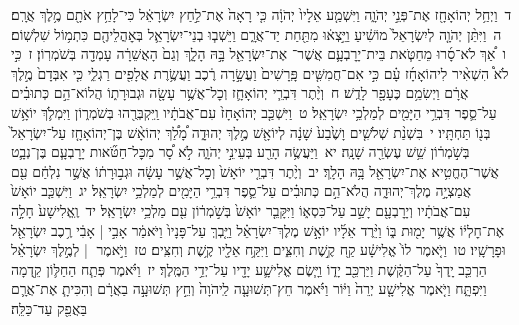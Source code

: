 \documentclass[18pt]{article}
\newcommand{\vart}[1]{\Bfootnote{#1}}	%
\begin{document}
 {\loc ד~}וַיְחַ֥ל יְהוֹאָחָ֖ז אֶת־פְּנֵ֣י יְהֹוָ֑ה וַיִּשְׁמַ֤ע אֵלָיו֙ יְהֹוָ֔ה כִּ֤י רָאָה֙ אֶת־לַ֣חַץ יִשְׂרָאֵ֔ל כִּי־לָחַ֥ץ אֹתָ֖ם מֶ֥לֶךְ אֲרָֽם׃ \startlock
 {\loc ה~}וַיִּתֵּ֨ן יְהֹוָ֤ה לְיִשְׂרָאֵל֙ מוֹשִׁ֔יעַ וַיֵּ֣צְא֔וּ מִתַּ֖חַת יַד־אֲרָ֑ם וַיֵּשְׁב֧וּ בְנֵי־יִשְׂרָאֵ֛ל  בְּאׇהֳלֵיהֶ֖ם  כִּתְמ֥וֹל שִׁלְשֽׁוֹם׃ \startlock
 {\loc ו~}אַ֠ךְ לֹא־סָ֜רוּ מֵחַטֹּ֧את בֵּית־יָרׇבְעָ֛ם אֲשֶׁר־ \edtext{הֶחֱטִ֥י}{\vart{=א | מ"ק-א=<ב' חס' א'> | ל-קרי=הֶחֱטִ֥יא | }}  אֶת־יִשְׂרָאֵ֖ל בָּ֣הּ הָלָ֑ךְ וְגַם֙ הָאֲשֵׁרָ֔ה עָמְדָ֖ה בְּשֹׁמְרֽוֹן׃ \startlock
 {\loc ז~}כִּ֣י לֹא֩ הִשְׁאִ֨יר לִיהוֹאָחָ֜ז עָ֗ם כִּ֣י אִם־חֲמִשִּׁ֤ים פָּֽרָשִׁים֙ וַעֲשָׂ֣רָה רֶ֔כֶב וַעֲשֶׂ֥רֶת אֲלָפִ֖ים רַגְלִ֑י כִּ֤י אִבְּדָם֙ מֶ֣לֶךְ אֲרָ֔ם וַיְשִׂמֵ֥ם כֶּעָפָ֖ר לָדֻֽשׁ׃ \startlock
 {\loc ח~}וְיֶ֨תֶר דִּבְרֵ֧י יְהוֹאָחָ֛ז וְכׇל־אֲשֶׁ֥ר עָשָׂ֖ה וּגְבוּרָת֑וֹ הֲלוֹא־הֵ֣ם כְּתוּבִ֗ים עַל־סֵ֛פֶר דִּבְרֵ֥י הַיָּמִ֖ים לְמַלְכֵ֥י יִשְׂרָאֵֽל׃ \startlock
 {\loc ט~}וַיִּשְׁכַּ֤ב יְהוֹאָחָז֙ עִם־אֲבֹתָ֔יו וַֽיִּקְבְּרֻ֖הוּ בְּשֹׁמְר֑וֹן וַיִּמְלֹ֛ךְ יוֹאָ֥שׁ בְּנ֖וֹ תַּחְתָּֽיו׃ \startlock
 {\loc י~}בִּשְׁנַ֨ת שְׁלֹשִׁ֤ים וָשֶׁ֙בַע֙ שָׁנָ֔ה לְיוֹאָ֖שׁ מֶ֣לֶךְ יְהוּדָ֑ה מָ֠לַ֠ךְ יְהוֹאָ֨שׁ בֶּן־יְהוֹאָחָ֤ז עַל־יִשְׂרָאֵל֙ בְּשֹׁ֣מְר֔וֹן שֵׁ֥שׁ עֶשְׂרֵ֖ה שָׁנָֽה׃ \startlock
 {\loc יא~}וַיַּעֲשֶׂ֥ה הָרַ֖ע בְּעֵינֵ֣י יְהֹוָ֑ה לֹ֣א סָ֠ר מִכׇּל־חַטֹּ֞אות יָרׇבְעָ֧ם בֶּן־נְבָ֛ט אֲשֶׁר־הֶחֱטִ֥יא אֶת־יִשְׂרָאֵ֖ל בָּ֥הּ הָלָֽךְ׃ \startlock
 {\loc יב~}וְיֶ֨תֶר דִּבְרֵ֤י יוֹאָשׁ֙ וְכׇל־אֲשֶׁ֣ר עָשָׂ֔ה וּגְב֣וּרָת֔וֹ אֲשֶׁ֣ר נִלְחַ֔ם עִ֖ם אֲמַצְיָ֣ה מֶלֶךְ־יְהוּדָ֑ה הֲלֹא־הֵ֣ם כְּתוּבִ֗ים עַל־סֵ֛פֶר דִּבְרֵ֥י הַיָּמִ֖ים לְמַלְכֵ֥י יִשְׂרָאֵֽל׃ \startlock
 {\loc יג~}וַיִּשְׁכַּ֤ב יוֹאָשׁ֙ עִם־אֲבֹתָ֔יו וְיָרׇבְעָ֖ם יָשַׁ֣ב עַל־כִּסְא֑וֹ וַיִּקָּבֵ֤ר יוֹאָשׁ֙ בְּשֹׁ֣מְר֔וֹן עִ֖ם מַלְכֵ֥י יִשְׂרָאֵֽל׃ \startlock
 {\loc יד~}וֶֽאֱלִישָׁע֙ חָלָ֣ה אֶת־חׇלְי֔וֹ אֲשֶׁ֥ר יָמ֖וּת בּ֑וֹ וַיֵּ֨רֶד אֵלָ֜יו יוֹאָ֣שׁ מֶלֶךְ־יִשְׂרָאֵ֗ל וַיֵּ֤בְךְּ עַל־פָּנָיו֙ וַיֹּאמַ֔ר אָבִ֣י  |  אָבִ֔י רֶ֥כֶב יִשְׂרָאֵ֖ל וּפָרָשָֽׁיו׃ \startlock
 {\loc טו~}וַיֹּ֤אמֶר לוֹ֙ אֱלִישָׁ֔ע קַ֖ח קֶ֣שֶׁת וְחִצִּ֑ים וַיִּקַּ֥ח אֵלָ֖יו קֶ֥שֶׁת וְחִצִּֽים׃ \startlock
 {\loc טז~}וַיֹּ֣אמֶר  |  לְמֶ֣לֶךְ יִשְׂרָאֵ֗ל הַרְכֵּ֤ב יָֽדְךָ֙ עַל־הַקֶּ֔שֶׁת וַיַּרְכֵּ֖ב יָד֑וֹ וַיָּ֧שֶׂם אֱלִישָׁ֛ע יָדָ֖יו עַל־יְדֵ֥י הַמֶּֽלֶךְ׃ \startlock
 {\loc יז~}וַיֹּ֗אמֶר פְּתַ֧ח הַחַלּ֛וֹן קֵ֖דְמָה וַיִּפְתָּ֑ח וַיֹּ֤אמֶר אֱלִישָׁ֤ע יְרֵה֙ וַיּ֔וֹר וַיֹּ֗אמֶר חֵץ־תְּשׁוּעָ֤ה לַֽיהֹוָה֙ וְחֵ֣ץ תְּשׁוּעָ֣ה בַאֲרָ֔ם וְהִכִּיתָ֧ אֶת־אֲרָ֛ם בַּאֲפֵ֖ק עַד־כַּלֵּֽה׃ \startlock
\end{document}
